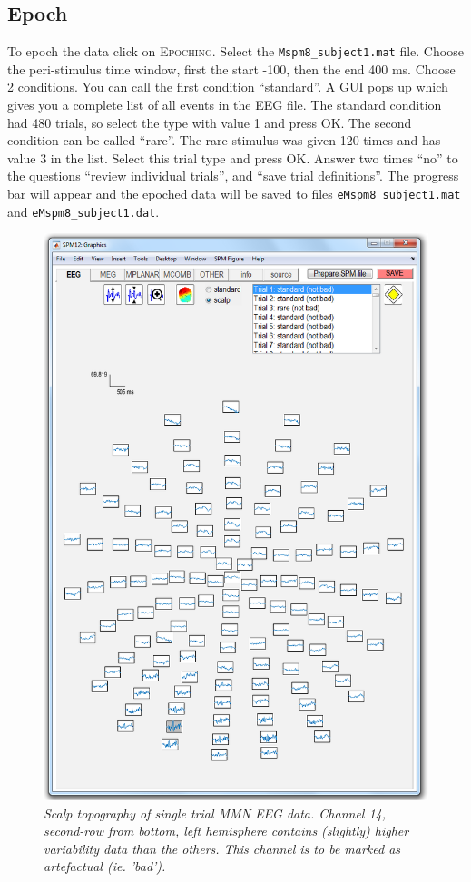 \subsection{Epoch}
To epoch the data click on \textsc{Epoching}. Select the \texttt{Mspm8\_subject1.mat} file. Choose the peri-stimulus time window, first the start -100, then the end 400 ms. Choose 2 conditions. You can call the first condition ``standard''. A GUI pops up which gives you a complete list of all events in the EEG file. The standard condition had 480 trials, so select the type with value 1 and press OK. The second condition can be called ``rare''. The rare stimulus was given 120 times and has value 3 in the list. Select this trial type and press OK. Answer two times ``no'' to the questions  ``review individual trials'', and ``save trial definitions''. The progress bar will appear and the epoched data will be saved to files \texttt{eMspm8\_subject1.mat} and \texttt{eMspm8\_subject1.dat}.
\begin{figure}
\begin{center}
\includegraphics[width=120mm]{mmn/topo1}
\caption{\em Scalp topography of single trial MMN EEG data. Channel 14, second-row from bottom, left hemisphere contains (slightly) higher variability data than the others. This channel is to be marked as artefactual (ie. 'bad').
\label{topo1}}
\end{center}
\end{figure}
